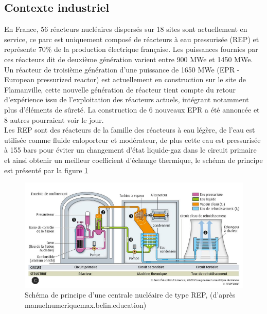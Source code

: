 \subsection{Contexte industriel}
En France, 56 réacteurs nucléaires dispersés sur 18 sites sont actuellement en service, ce parc est uniquement composé de réacteurs à eau pressurisée (REP) et représente 70\% de la production électrique française. Les puissances fournies par ces réacteurs dit de deuxième génération varient entre 900 MWe et 1450 MWe. Un réacteur de troisième génération d'une puissance de 1650 MWe (EPR - European pressurized reactor) est actuellement en construction sur le site de Flamanville, cette nouvelle génération de réacteur tient compte du retour d'expérience issu de l'exploitation des réacteurs actuels, intégrant notamment plus d'éléments de sûreté. La construction de 6 nouveaux EPR a été annoncée et 8 autres pourraient voir le jour. \\
Les REP sont des réacteurs de la famille des réacteurs à eau légère, de l'eau est utilisée comme fluide caloporteur et modérateur, de plus cette eau est pressurisée à 155 bars pour éviter un changement d'état liquide-gaz dans le circuit primaire et ainsi obtenir un meilleur coefficient d'échange thermique, le schéma de principe est présenté par la figure \ref{fig:schcentrale1} %
\begin{figure}[H]
	\centering
	\includegraphics[width=0.8\linewidth]{figure/sch_centrale1}
	\caption[Schéma de principe d'une centrale nucléaire de type REP]{Schéma de principe d'une centrale nucléaire de type REP, (d'après manuelnumeriquemax.belin.education)}
	\label{fig:schcentrale1}
\end{figure} 
%
